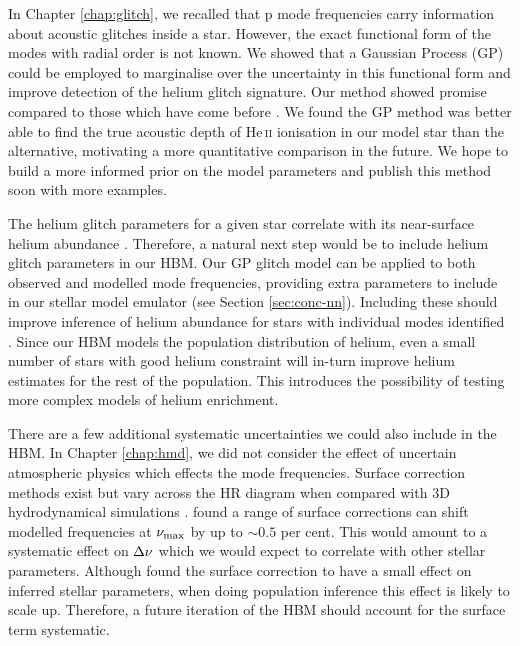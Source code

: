 In Chapter \ref{chap:glitch}, we recalled that p mode frequencies carry information about acoustic glitches inside a star. However, the exact functional form of the modes with radial order is not known. We showed that a Gaussian Process (GP) could be employed to marginalise over the uncertainty in this functional form and improve detection of the helium glitch signature. Our method showed promise compared to those which have come before \citep[e.g.][]{Verma.Raodeo.ea2019}. We found the GP method was better able to find the true acoustic depth of He\,\textsc{ii} ionisation in our model star than the alternative, motivating a more quantitative comparison in the future. We hope to build a more informed prior on the model parameters and publish this method soon with more examples.

The helium glitch parameters for a given star correlate with its near-surface helium abundance \citep{Houdek.Gough2007}. Therefore, a natural next step would be to include helium glitch parameters in our HBM. Our GP glitch model can be applied to both observed and modelled mode frequencies, providing extra parameters to include in our stellar model emulator (see Section \ref{sec:conc-nn}). Including these should improve inference of helium abundance for stars with individual modes identified \citep[e.g.][]{Davies.SilvaAguirre.ea2016,Lund.SilvaAguirre.ea2017}. Since our HBM models the population distribution of helium, even a small number of stars with good helium constraint will in-turn improve helium estimates for the rest of the population. This introduces the possibility of testing more complex models of helium enrichment.


There are a few additional systematic uncertainties we could also include in the HBM. In Chapter \ref{chap:hmd}, we did not consider the effect of uncertain atmospheric physics which effects the mode frequencies. Surface correction methods exist \citep[e.g.][]{Ball.Gizon2014,Kjeldsen.Bedding.ea2008} but vary across the HR diagram when compared with 3D hydrodynamical simulations \cite{Sonoi.Samadi.ea2015}. \citet{Compton.Bedding.ea2018} found a range of surface corrections can shift modelled frequencies at \({\nu_\mathrm{max}}\) by up to \(\sim 0.5\) per cent. This would amount to a systematic effect on \({\Delta\nu}\) which we would expect to correlate with other stellar parameters. Although \citet{Nsamba.Campante.ea2018} found the surface correction to have a small effect on inferred stellar parameters, when doing population inference this effect is likely to scale up. Therefore, a future iteration of the HBM should account for the surface term systematic.

